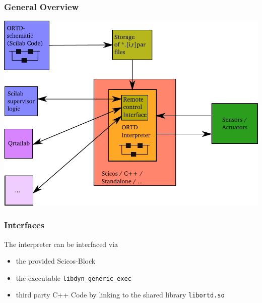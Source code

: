 \documentclass[serif,9pt,xcolor=dvipsnames]{beamer}
\begin{document}
\begin{frame}

 \frametitle{General Overview}



\includegraphics[trim=0mm 0mm 0mm 0mm, clip,width=0.95\linewidth]{../pictures/ortd_principle.pdf}

\end{frame}


\begin{frame}
\frametitle{Interfaces}

The interpreter can be interfaced via
  \begin{itemize}
   \item the provided Scicos-Block
   \item the executable \texttt{libdyn\_generic\_exec}
   \item third party C++ Code by linking to the shared library { \texttt{libortd.so} }
  \end{itemize}

\end{frame}
\end{document}
